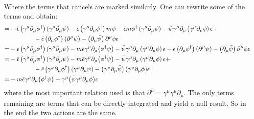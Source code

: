 \documentclass[11pt, oneside]{article}   	%
\begin{document}
\begin{enumerate}[label=\alph*)]
\begin{align*}
\end{align*}
Where the terms that cancels are marked similarly. One can rewrite some of the terms and obtain:
\begin{align*}
	= & -\bar{\epsilon}\left(\gamma^{\mu} \partial_{\mu} \phi^{\dagger}\right)\left(\gamma^{\mu} \partial_{\mu} \psi\right)-\bar{\epsilon}\left(\gamma^{\mu} \partial_{\mu} \phi^{\dagger}\right) m \psi-\bar{\epsilon} m \phi^{\dagger}\left(\gamma^{\mu} \partial_{\mu} \psi\right) -\bar{\psi}\gamma^{\mu} \partial_{\mu}\left(\gamma^{\mu} \partial_{\mu}\phi\right) \epsilon +\\
	& \qquad \qquad -\bar{\epsilon} \left(\partial_{\mu} \phi^{\dagger}\right)\left(\partial^{\mu} \psi\right)-\left(\partial_{\mu} \bar{\psi}\right) \partial^{\mu} \phi \epsilon  \\
	= & -\bar{\epsilon}\left(\gamma^{\mu} \partial_{\mu} \phi^{\dagger}\right)\left(\gamma^{\mu} \partial_{\mu} \psi\right) - m \bar{\epsilon} \gamma^\mu \partial_\mu \qty(\phi^\dagger \psi) -\bar{\psi}\gamma^{\mu} \partial_{\mu}\left(\gamma^{\mu} \partial_{\mu}\phi\right) \epsilon -\bar{\epsilon} \left(\partial_{\mu} \phi^{\dagger}\right)\left(\partial^{\mu} \psi\right)-\left(\partial_{\mu} \bar{\psi}\right) \partial^{\mu} \phi \epsilon \\
	= & -\bar{\epsilon}\left(\gamma^{\mu} \partial_{\mu} \phi^{\dagger}\right)\left(\gamma^{\mu} \partial_{\mu} \psi\right) - m \bar{\epsilon} \gamma^\mu \partial_\mu \qty(\phi^\dagger \psi) -\bar{\psi}\gamma^{\mu} \partial_{\mu}\left(\gamma^{\mu} \partial_{\mu}\phi\right) \epsilon + \\
	& \qquad \qquad -\bar{\epsilon} \left(\gamma^\mu\partial_{\mu} \phi^{\dagger}\right)\left(\gamma^\mu \partial_{\mu} \psi\right)-\left(\gamma^\mu\partial_{\mu} \bar{\psi}\right) \qty(\gamma^\mu \partial_{\mu} \phi) \epsilon \\
	=& - m \bar{\epsilon} \gamma^\mu \partial_\mu \qty(\phi^\dagger \psi) - \gamma^\mu \qty( \bar{\psi} \gamma^\mu \partial_\mu \phi ) \epsilon
\end{align*}
where the most important relation used is that $\partial^\mu = \gamma^\mu \gamma^\mu \partial_\mu$. The only terms remaining are terms that can be directly integrated and yield a null result. So in the end the two actions are the same.

\end{enumerate}
\end{document}
